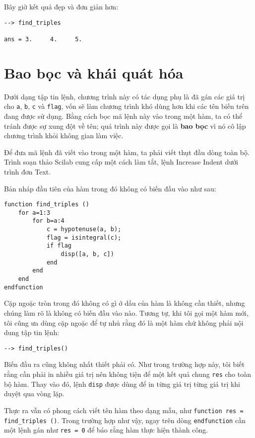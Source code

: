 \documentclass[12pt]{book}
\begin{document}
Bây giờ kết quả đẹp và đơn giản hơn:

\begin{verbatim}
--> find_triples

ans = 3.     4.     5.
\end{verbatim}




\section{Bao bọc và khái quát hóa}

Dưới dạng tập tin lệnh, chương trình này có tác dụng phụ là đã gán các
giá trị cho {\tt a}, {\tt b}, {\tt c} và {\tt flag}, vốn sẽ làm 
chương trình khó dùng hơn khi các tên biến trên đang được sử dụng.
Bằng cách bọc mã lệnh này vào trong một hàm, ta có thể tránh được sự
xung đột về tên; quá trình này được gọi là {\bf bao bọc} vì nó 
cô lập chương trình khỏi không gian làm việc.

Để đưa mã lệnh đã viết vào trong một hàm, ta phải viết thụt đầu 
dòng toàn bộ. Trình soạn thảo Scilab cung cấp một cách làm tắt,
lệnh {\sf Increase Indent} dưới trình đơn {\sf Text}. 

Bản nháp đầu tiên của hàm trong đó không có biến đầu vào như sau:

\begin{verbatim}
function find_triples ()
    for a=1:3
        for b=a:4
            c = hypotenuse(a, b);
            flag = isintegral(c);
            if flag
                disp([a, b, c])
            end
        end
    end
endfunction
\end{verbatim}

Cặp ngoặc tròn trong đó không có gì ở dấu của hàm là không cần thiết,
nhưng chúng làm rõ là không có biến đầu vào nào. Tương tự, khi tôi gọi
một hàm mới, tôi cũng ưa dùng cặp ngoặc để tự nhủ rằng đó là một hàm
chứ không phải nội dung tập tin lệnh:

\begin{verbatim}
--> find_triples()
\end{verbatim}

Biến đầu ra cũng không nhất thiết phải có. Như trong trường hợp này,
tôi biết rằng cần phải in nhiều giá trị nên không tiện để một kết quả chung
\texttt{res} cho toàn bộ hàm. Thay vào đó, lệnh \texttt{disp} được dùng
để in từng giá trị từng giá trị khi duyệt qua vòng lặp. 

Thực ra vẫn có phong cách viết tên hàm theo dạng mẫu, như 
\texttt{function res = find\_triples ()}. Trong trường hợp như vậy,
ngay trên dòng \texttt{endfunction} cần một lệnh gán như \texttt{res = 0}
để báo rằng hàm thực hiện thành công.
\end{document}
